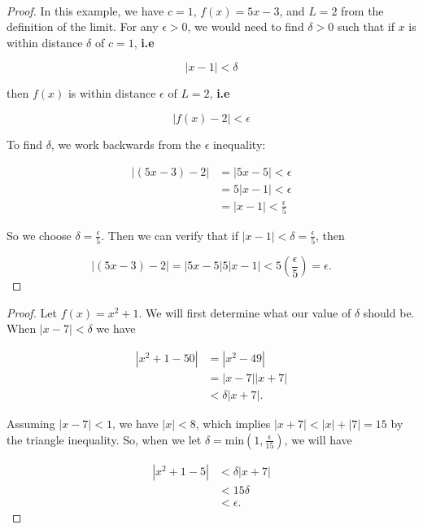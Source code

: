         \pagebreak

         \\

        \begin{proof}
            In this example, we have $c=1$, $f(x)=5x-3$, and $L=2$ from the definition of the limit. For any $\epsilon>0$, we would need to find $\delta>0$ such that if $x$ is within distance $\delta$ of $c=1$, \textbf{i.e}

            \[
                |x-1| < \delta
            \]

            then $f(x)$ is within distance $\epsilon$ of $L=2$, \textbf{i.e}

            \[
                |f(x)-2| < \epsilon
            \]

            To find $\delta$, we work backwards from the $\epsilon$ inequality:

            \begin{align*}
                |(5x-3) - 2|    &= |5x-5| < \epsilon \\
                                &= 5|x-1| < \epsilon \\
                                &= |x-1| < \frac{\epsilon}{5}
            \end{align*}

            So we choose $\delta = \frac{\epsilon}{5}$. Then we can verify that if $|x-1|<\delta=\frac{\epsilon}{5}$, then

            \[
                |(5x-3)-2| = |5x-5| 5|x-1| < 5\left(\frac{\epsilon}{5}\right) = \epsilon.
            \]
        \end{proof}


        \begin{proof}
            Let $f(x)=x^2 +1$. We will first determine what our value of $\delta$ should be. When $|x-7|<\delta$ we have

            \begin{align*}
                |x^2 + 1-50|    &= |x^2 - 49| \\
                                &= |x-7||x+7| \\
                                &< \delta|x+7|.
            \end{align*}

            Assuming $|x-7|<1$, we have $|x|<8$, which implies $|x+7|<|x|+|7|=15$ by the triangle inequality. So, when we let $\delta=\text{min}\left(1, \frac{\epsilon}{15}\right)$, we will have

            \begin{align*}
                |x^2 + 1 -5|   &< \delta |x+7| \\
                                &< 15\delta \\
                                &< \epsilon.
            \end{align*}
        \end{proof}

